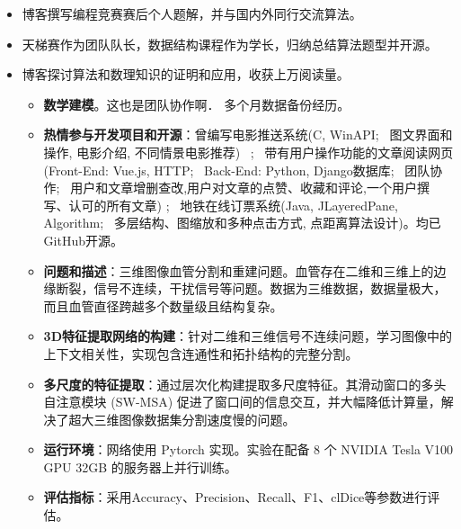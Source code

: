 \documentclass{resume}
\begin{document}
\begin{itemize}

  \item 博客撰写编程竞赛赛后个人题解，并与国内外同行交流算法。
  \item 天梯赛作为团队队长，数据结构课程作为学长，归纳总结算法题型并开源。
  \item 博客探讨算法和数理知识的证明和应用，收获上万阅读量。

\begin{itemize}
	
	
\item \textbf{数学建模}。这也是团队协作啊．  多个月数据备份经历。
  

  
\item \textbf{热情参与开发项目和开源}：曾编写电影推送系统(C, WinAPI; \, 图文界面和操作, 电影介绍, 不同情景电影推荐) \, ; \, 带有用户操作功能的文章阅读网页(Front-End: Vue.js, HTTP; \, Back-End: Python, Django数据库; \, 团队协作; \, 用户和文章增删查改,用户对文章的点赞、收藏和评论,一个用户撰写、认可的所有文章) ; \, 地铁在线订票系统(Java, JLayeredPane, Algorithm; \, 多层结构、图缩放和多种点击方式, 点距离算法设计)。均已GitHub开源。

\end{itemize}


\begin{itemize}	
	\item \textbf{问题和描述}：三维图像血管分割和重建问题。血管存在二维和三维上的边缘断裂，信号不连续，干扰信号等问题。数据为三维数据，数据量极大，而且血管直径跨越多个数量级且结构复杂。
	\item \textbf{3D特征提取网络的构建}：针对二维和三维信号不连续问题，学习图像中的上下文相关性，实现包含连通性和拓扑结构的完整分割。
	\item \textbf{多尺度的特征提取}：通过层次化构建提取多尺度特征。其滑动窗口的多头自注意模块 (SW-MSA) 促进了窗口间的信息交互，并大幅降低计算量，解决了超大三维图像数据集分割速度慢的问题。
	\item \textbf{运行环境}：网络使用 Pytorch 实现。实验在配备 8 个 NVIDIA Tesla V100 GPU 32GB 的服务器上并行训练。
	\item \textbf{评估指标}：采用Accuracy、Precision、Recall、F1、clDice等参数进行评估。
\end{itemize}


\end{itemize}
\end{document}
